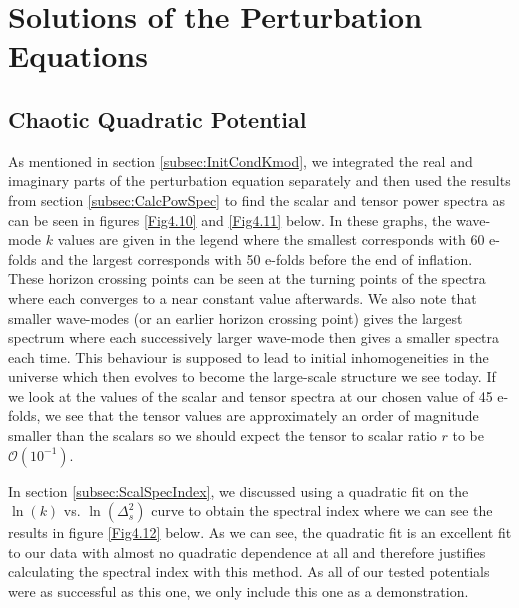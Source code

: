 \documentclass[a4paper,12pt,twoside]{report}
\begin{document}
\section{Solutions of the Perturbation Equations} \label{sec:SolPertEquat}

\subsection{Chaotic Quadratic Potential} \label{subsec:Res_Pert_Square}

As mentioned in section \ref{subsec:InitCondKmod}, we integrated the real and imaginary parts of the perturbation equation separately and then used the results from section \ref{subsec:CalcPowSpec} to find the scalar and tensor power spectra as can be seen in figures \ref{Fig4.10} and \ref{Fig4.11} below. In these graphs, the wave-mode $k$ values are given in the legend where the smallest corresponds with 60 e-folds and the largest corresponds with 50 e-folds before the end of inflation. These horizon crossing points can be seen at the turning points of the spectra where each converges to a near constant value afterwards. We also note that smaller wave-modes (or an earlier horizon crossing point) gives the largest spectrum where each successively larger wave-mode then gives a smaller spectra each time. This behaviour is supposed to lead to initial inhomogeneities in the universe which then evolves to become the large-scale structure we see today. If we look at the values of the scalar and tensor spectra at our chosen value of 45 e-folds, we see that the tensor values are approximately an order of magnitude smaller than the scalars so we should expect the tensor to scalar ratio $r$ to be $\mathcal{O}(10^{-1})$.

In section \ref{subsec:ScalSpecIndex}, we discussed using a quadratic fit on the $\ln(k)$ vs. $\ln(\Delta_{s}^{2})$ curve to obtain the spectral index where we can see the results in figure \ref{Fig4.12} below. As we can see, the quadratic fit is an excellent fit to our data with almost no quadratic dependence at all and therefore justifies calculating the spectral index with this method. As all of our tested potentials were as successful as this one, we only include this one as a demonstration.
\end{document}
